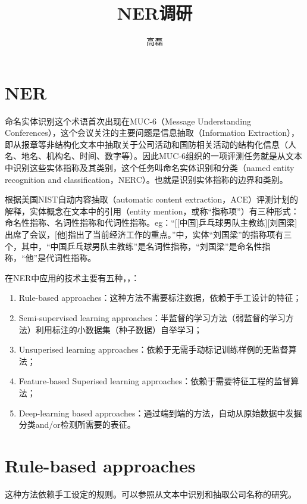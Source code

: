 \documentclass[a4paper,UTF8,no-math]{ctexart}
\title{NER调研}
\author{高磊}
\date{\zhtoday}
\begin{document}
	\tableofcontents
	
	\newpage
	
	\section{NER}
	命名实体识别这个术语首次出现在MUC-6（Message Understanding Conferences），这个会议关注的主要问题是信息抽取（Information Extraction），即从报章等非结构化文本中抽取关于公司活动和国防相关活动的结构化信息（人名、地名、机构名、时间、数字等）。因此MUC-6组织的一项评测任务就是从文本中识别这些实体指称及其类别，这个任务叫命名实体识别和分类（named entity recognition and classification，NERC）。也就是识别实体指称的边界和类别。
	
	根据美国NIST自动内容抽取（automatic content extraction，ACE）评测计划的解释，实体概念在文本中的引用（entity mention，或称“指称项”）有三种形式：命名性指称、名词性指称和代词性指称。eg：“[[中国]乒乓球男队主教练][刘国梁]出席了会议，[他]指出了当前经济工作的重点。”中，实体“刘国梁”的指称项有三个，其中，“中国乒乓球男队主教练”是名词性指称，“刘国梁”是命名性指称，“他”是代词性指称。
	
	在NER中应用的技术主要有五种\citep{nadeau2007survey}，\citep{li2018survey}，\citep{宗成庆2013统计自然语言处理}：
	
	\begin{enumerate}
		\item Rule-based approaches：这种方法不需要标注数据，依赖于手工设计的特征；
		\item Semi-supervised learning approaches：半监督的学习方法（弱监督的学习方法）利用标注的小数据集（种子数据）自举学习；
		\item Unsuperised learning approaches：依赖于无需手动标记训练样例的无监督算法；
		\item Feature-based Superised learning approaches：依赖于需要特征工程的监督算法；
		\item Deep-learning based approaches：通过端到端的方法，自动从原始数据中发掘分类and/or检测所需要的表征。
	\end{enumerate}
	
	\section{Rule-based approaches}
	
	这种方法依赖手工设定的规则。可以参照\citep{rau1991extracting}从文本中识别和抽取公司名称的研究。
	
\end{document}
